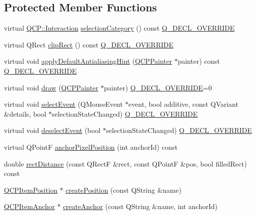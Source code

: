 \subsection*{Protected Member Functions}
\begin{DoxyCompactItemize}
\item 
virtual \hyperlink{namespace_q_c_p_a2ad6bb6281c7c2d593d4277b44c2b037}{Q\+C\+P\+::\+Interaction} \hyperlink{class_q_c_p_abstract_item_aceb5f99c361cf023c7cbe7339ea29571}{selection\+Category} () const \hyperlink{qcustomplot_8h_a42cc5eaeb25b85f8b52d2a4b94c56f55}{Q\+\_\+\+D\+E\+C\+L\+\_\+\+O\+V\+E\+R\+R\+I\+DE}
\item 
virtual Q\+Rect \hyperlink{class_q_c_p_abstract_item_a6ad60000f29afe11035e1f791dcbd45a}{clip\+Rect} () const \hyperlink{qcustomplot_8h_a42cc5eaeb25b85f8b52d2a4b94c56f55}{Q\+\_\+\+D\+E\+C\+L\+\_\+\+O\+V\+E\+R\+R\+I\+DE}
\item 
virtual void \hyperlink{class_q_c_p_abstract_item_a5579ce9ec7cad202499886b042448b10}{apply\+Default\+Antialiasing\+Hint} (\hyperlink{class_q_c_p_painter}{Q\+C\+P\+Painter} $\ast$painter) const \hyperlink{qcustomplot_8h_a42cc5eaeb25b85f8b52d2a4b94c56f55}{Q\+\_\+\+D\+E\+C\+L\+\_\+\+O\+V\+E\+R\+R\+I\+DE}
\item 
virtual void \hyperlink{class_q_c_p_abstract_item_a007fdab79c935a5da5aa04a21d268c18}{draw} (\hyperlink{class_q_c_p_painter}{Q\+C\+P\+Painter} $\ast$painter) \hyperlink{qcustomplot_8h_a42cc5eaeb25b85f8b52d2a4b94c56f55}{Q\+\_\+\+D\+E\+C\+L\+\_\+\+O\+V\+E\+R\+R\+I\+DE}=0
\item 
virtual void \hyperlink{class_q_c_p_abstract_item_aa4b969c58797f39c9c0b6c07c7869d17}{select\+Event} (Q\+Mouse\+Event $\ast$event, bool additive, const Q\+Variant \&details, bool $\ast$selection\+State\+Changed) \hyperlink{qcustomplot_8h_a42cc5eaeb25b85f8b52d2a4b94c56f55}{Q\+\_\+\+D\+E\+C\+L\+\_\+\+O\+V\+E\+R\+R\+I\+DE}
\item 
virtual void \hyperlink{class_q_c_p_abstract_item_af9093798cb07a861dcc73f93ca16c0c1}{deselect\+Event} (bool $\ast$selection\+State\+Changed) \hyperlink{qcustomplot_8h_a42cc5eaeb25b85f8b52d2a4b94c56f55}{Q\+\_\+\+D\+E\+C\+L\+\_\+\+O\+V\+E\+R\+R\+I\+DE}
\item 
virtual Q\+PointF \hyperlink{class_q_c_p_abstract_item_ada5bad4e1196c4fc0d0d12328e24b8f2}{anchor\+Pixel\+Position} (int anchor\+Id) const
\item 
double \hyperlink{class_q_c_p_abstract_item_a7dfc2007e36d09b8b5c988a9f06d6a7e}{rect\+Distance} (const Q\+RectF \&rect, const Q\+PointF \&pos, bool filled\+Rect) const
\item 
\hyperlink{class_q_c_p_item_position}{Q\+C\+P\+Item\+Position} $\ast$ \hyperlink{class_q_c_p_abstract_item_a75036d39c4d4e2e1a7dd145fff915d32}{create\+Position} (const Q\+String \&name)
\item 
\hyperlink{class_q_c_p_item_anchor}{Q\+C\+P\+Item\+Anchor} $\ast$ \hyperlink{class_q_c_p_abstract_item_af3fc92527802078ca395138748b629a7}{create\+Anchor} (const Q\+String \&name, int anchor\+Id)
\end{DoxyCompactItemize}
